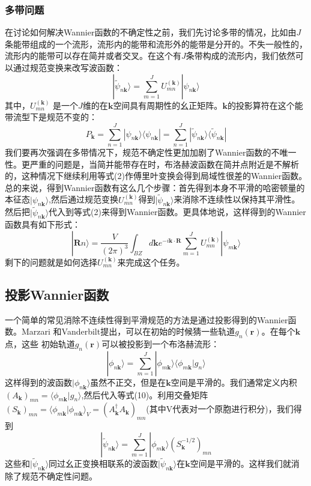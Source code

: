 \subsubsection{多带问题}
在讨论如何解决Wannier函数的不确定性之前，我们先讨论多带的情况，比如由$J$条能带组成的一个流形，流形内的能带和流形外的能带是分开的。不失一般性的，流形内的能带可以存在简并或者交叉。在这个有$J$条带构成的流形内，我们依然可以通过规范变换来改写波函数：
\begin{equation}
|\widetilde \psi_{n\bm{k}}\rangle= \sum_{m=1}^{J}U^{(\bm{k})}_{mn} |\psi_{n\bm{k}}\rangle
\end{equation}
其中，$U^{(\bm{k})}_{mn}$ 是一个$J$维的在$\bm{k}$空间具有周期性的幺正矩阵。$\bm{k}$的投影算符在这个能带流型下是规范不变的：
\begin{equation}
P_{\bm{k}}= \sum_{n=1}^{J}|\psi_{n\bm{k}}\rangle \langle\psi_{n\bm{k}} |= \sum_{n=1}^{J}|\widetilde\psi_{n\bm{k}}\rangle \langle\widetilde \psi_{n\bm{k}} |
\end{equation}
我们要再次强调在多带情况下，规范不确定性更加加剧了Wannier函数的不唯一性。更严重的问题是，当简并能带存在时，布洛赫波函数在简并点附近是不解析的，这种情况下继续利用等式(2)作傅里叶变换会得到局域性很差的Wannier函数。
总的来说，得到Wannier函数有这么几个步骤：首先得到本身不平滑的哈密顿量的本征态$|\psi_{n\bm{k}}\rangle$,然后通过规范变换$U^{(\bm{k})}_{mn}$得到$|\widetilde\psi_{n\bm{k}}\rangle$来消除不连续性以保持其平滑性。然后把$|\widetilde\psi_{n\bm{k}}\rangle$代入到等式(2)来得到Wannier函数。更具体地说，这样得到的Wannier函数具有如下形式：
\begin{equation}
|\bm{R}n \rangle=\frac{V}{(2\pi)^3} \int_{BZ}d\bm{k} e^{-i\bm{k}\cdot\bm{R}} \sum_{m=1}^{J}U^{(\bm{k})}_{mn}|\psi_{m\bm{k}}\rangle
\end{equation}
剩下的问题就是如何选择$U^{(\bm{k})}_{mn}$来完成这个任务。

\subsection{投影Wannier函数}
一个简单的常见消除不连续性得到平滑规范的方法是通过投影得到的Wannier函数。Marzari 和Vanderbilt提出，可以在初始的时候猜一些轨道$g_{n}(\bm{r})$。在每个$\bm{k}$点，这些 初始轨道$g_{n}(\bm{r})$可以被投影到一个布洛赫流形：
\begin{equation}
|\phi_{n\bm{k}}\rangle=\sum_{m=1}^{J}|\phi_{m\bm{k}}\rangle \langle \phi_{m\bm{k}}|g_{n}\rangle
\end{equation}
这样得到的波函数$|\phi_{n\bm{k}}\rangle$虽然不正交，但是在$\bm{k}$空间是平滑的。我们通常定义内积$(A_{\bm{k}})_{mn}=\langle \phi_{m\bm{k}}|g_{n}\rangle$,然后代入等式(10)。利用交叠矩阵$(S_{\bm{k}})_{mn}=\langle \phi_{m\bm{k}}| \phi_{m\bm{k}}\rangle_V=(A^\dagger_{\bm{k}}A_{\bm{k}})_{mn}$(其中V代表对一个原胞进行积分)，我们得到
\begin{equation}
|\widetilde\psi_{n\bm{k}}\rangle=\sum_{m=1}^{J}|\phi_{m\bm{k}}\rangle (S^{-1/2}_{\bm{k}})_{mn}
\end{equation}
这些和$|\widetilde\psi_{n\bm{k}}\rangle$同过幺正变换相联系的波函数$|\widetilde\psi_{n\bm{k}}\rangle$在$\bm{k}$空间是平滑的。这样我们就消除了规范不确定性问题。

